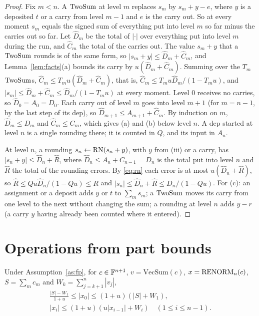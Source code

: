 \begin{proof}
Fix $m < n$. A $\mathrm{TwoSum}$ at level $m$ replaces $s_m$ by $s_m + y - e$, where $y$ is a deposited $t$ or a carry from
level $m-1$ and $e$ is the carry out. So at every moment $s_m$ equals the signed sum of everything put into level $m$
so far minus the carries out so far. Let $\hat D_m$ be the total of $|\cdot|$ over everything put into level $m$
during the run, and $\hat C_m$ the total of the carries out. The value $s_m + y$ that a $\mathrm{TwoSum}$ rounds is of the same
form, so $|s_m + y| \le \hat D_m + \hat C_m$, and Lemma~\ref{lem:facts}(a) bounds its carry by $u(\hat D_m + \hat
C_m)$. Summing over the $T_m$ $\mathrm{TwoSum}$s, $\hat C_m \le T_m u(\hat D_m + \hat C_m)$, that is, $\hat C_m \le T_m u \hat
D_m/(1 - T_m u)$, and $|s_m| \le \hat D_m + \hat C_m \le \hat D_m/(1 - T_m u)$ at every moment. Level 0 receives no
carries, so $\hat D_0 = A_0 = D_0$. Each carry out of level $m$ goes into level $m+1$ (for $m = n-1$, by the last step
of its dep), so $\hat D_{m+1} \le A_{m+1} + \hat C_m$. By induction on $m$, $\hat D_m \le D_m$ and $\hat C_m \le C_m$,
which gives (a) and (b) below level $n$. A dep started at level $n$ is a single rounding there; it is counted in $Q$,
and its input in $A_n$.

At level $n$, a rounding $s_n \gets \mathrm{RN}(s_n + y)$, with $y$ from (iii) or a carry, has $|s_n + y| \le \hat D_n + \hat
R$, where $\hat D_n \le A_n + C_{n-1} = D_n$ is the total put into level $n$ and $\hat R$ the total of the rounding
errors. By \eqref{eq:rn} each error is at most $u(\hat D_n + \hat R)$, so $\hat R \le Q u \hat D_n/(1 - Qu) \le R$ and
$|s_n| \le \hat D_n + \hat R \le D_n/(1-Qu)$. For (c): an assignment or a deposit adds $y$ or $t$ to $\sum_m s_m$; a
$\mathrm{TwoSum}$ moves its carry from one level to the next without changing the sum; a rounding at level $n$ adds $y - r$ (a
carry $y$ having already been counted where it entered).
\end{proof}

\section{Operations from part bounds}

\begin{lemma}\label{lem:o}
Under Assumption~\ref{as:fp}, for $c \in \mathbb{F}^{n+1}$, $v = \mathrm{VecSum}(c)$, $x = \mathrm{RENORM}_n(c)$, $S = \sum_m c_m$ and $W_k =
\sum_{j=k+1}^{n}|v_j|$,
\begin{gather*}
\frac{|S| - W_1}{1+u} \le |x_0| \le (1+u)(|S| + W_1), \\
|x_i| \le (1+u)(u|x_{i-1}| + W_i) \quad (1 \le i \le n-1).
\end{gather*}
\end{lemma}

